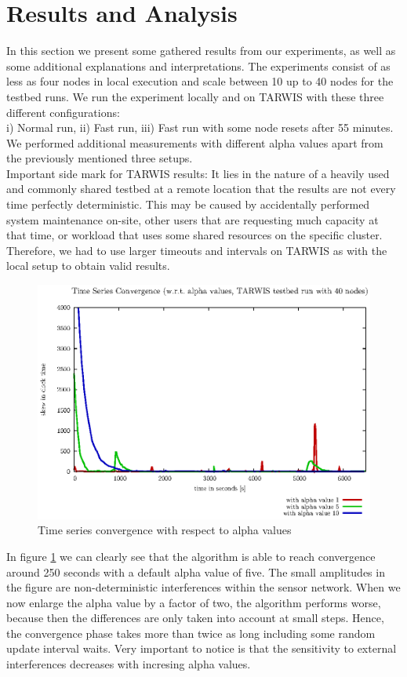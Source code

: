 \documentclass{llncs}
\begin{document}
\section{Results and Analysis}
In this section we present some gathered results from our experiments, as well as some additional explanations and interpretations. The experiments consist of as less as four nodes in local execution and scale between 10 up to 40 nodes for the testbed runs. We run the experiment locally and on TARWIS with these three different configurations:\\ i) Normal run, ii) Fast run, iii) Fast run with some node resets after 55 minutes.\\
We performed additional measurements with different alpha values apart from the previously mentioned three setups.\\
\indent Important side mark for TARWIS results: It lies in the nature of a heavily used and commonly shared testbed at a remote location that the results are not every time perfectly deterministic. This may be caused by accidentally performed system maintenance on-site, other users that are requesting much capacity at that time, or workload that uses some shared resources on the specific cluster. Therefore, we had to use larger timeouts and intervals on TARWIS as with the local setup to obtain valid results.
\begin{figure}[H]
\centering
\includegraphics[scale=0.6]{images/FIG_01.eps}
\caption{Time series convergence with respect to alpha values}
\label{fig:alpha}
\end{figure}
\noindent In figure \ref{fig:alpha} we can clearly see that the algorithm is able to reach convergence around 250 seconds with a default alpha value of five. The small amplitudes in the figure are non-deterministic interferences within the sensor network. When we now enlarge the alpha value by a factor of two, the algorithm performs worse, because then the differences are only taken into account at small steps. Hence, the convergence phase takes more than twice as long including some random update interval waits. Very important to notice is that the sensitivity to external interferences decreases with incresing alpha values.\\
\end{document}
